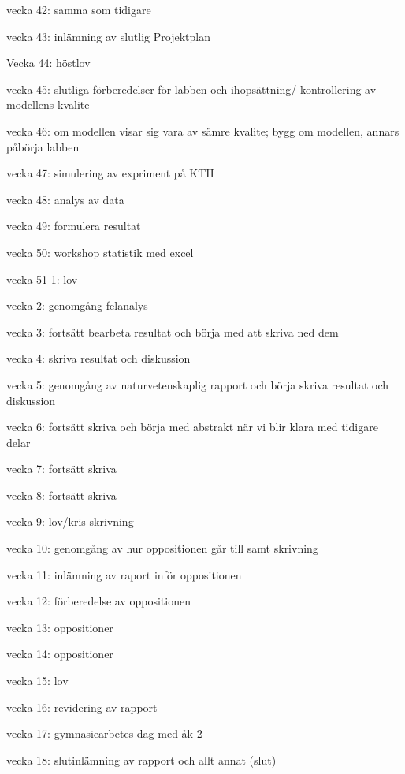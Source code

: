 vecka 42: samma som tidigare

vecka 43: inlämning av slutlig Projektplan

Vecka 44: höstlov

vecka 45: slutliga förberedelser för labben och ihopsättning/ kontrollering av modellens kvalite

vecka 46: om modellen visar sig vara av sämre kvalite; bygg om modellen, annars påbörja labben

vecka 47: simulering av expriment på KTH

vecka 48: analys av data

vecka 49: formulera resultat

vecka 50: workshop statistik med excel

vecka 51-1: lov

vecka 2: genomgång felanalys

vecka 3: fortsätt bearbeta resultat och börja med att skriva ned dem

vecka 4: skriva resultat och diskussion

vecka 5: genomgång av naturvetenskaplig rapport och börja skriva resultat och diskussion

vecka 6: fortsätt skriva och börja med abstrakt när vi blir klara med tidigare delar

vecka 7: fortsätt skriva

vecka 8: fortsätt skriva

vecka 9: lov/kris skrivning

vecka 10: genomgång av hur oppositionen går till samt skrivning

vecka 11: inlämning av raport inför oppositionen

vecka 12: förberedelse av oppositionen

vecka 13: oppositioner

vecka 14: oppositioner

vecka 15: lov

vecka 16: revidering av rapport

vecka 17: gymnasiearbetes dag med åk 2

vecka 18: slutinlämning av rapport och allt annat (slut)